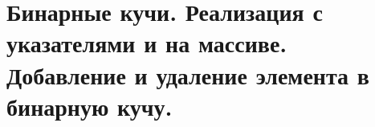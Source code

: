 \section{Бинарные кучи. Реализация с указателями и на массиве. Добавление и удаление элемента в бинарную кучу. }

